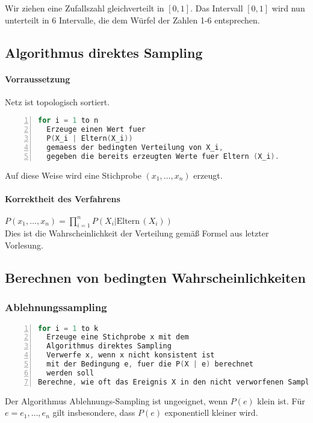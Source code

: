 \documentclass[a4paper]{scrartcl}
\begin{document}
Wir ziehen eine Zufallszahl gleichverteilt in $[0,1]$. Das Intervall $[0,1]$ wird nun unterteilt in 6 Intervalle, die dem Würfel der Zahlen 1-6 entsprechen.

\subsection{Algorithmus direktes Sampling}
\paragraph{Vorraussetzung} Netz ist topologisch sortiert.
\begin{lstlisting}[numbers=left, tabsize=4, language=C]
for i = 1 to n
  Erzeuge einen Wert fuer
  P(X_i | Eltern(X_i))
  gemaess der bedingten Verteilung von X_i,
  gegeben die bereits erzeugten Werte fuer Eltern (X_i).
\end{lstlisting}
Auf diese Weise wird eine Stichprobe $(x_1,\dots,x_n)$ erzeugt.
\paragraph{Korrektheit des Verfahrens} $P(x_1,\dots,x_n) = \prod\limits_{i=1}^{n} P(X_i | \text{Eltern} \, (X_i)) $\\
Dies ist die Wahrscheinlichkeit der Verteilung gemäß Formel aus letzter Vorlesung.
\subsection{Berechnen von bedingten Wahrscheinlichkeiten}
\subsubsection{Ablehnungssampling}
\begin{lstlisting}[numbers=left, tabsize=4, language=C]
for i = 1 to k
  Erzeuge eine Stichprobe x mit dem
  Algorithmus direktes Sampling
  Verwerfe x, wenn x nicht konsistent ist
  mit der Bedingung e, fuer die P(X | e) berechnet
  werden soll
Berechne, wie oft das Ereignis X in den nicht verworfenen Samples vorkommt.
\end{lstlisting}

Der Algorithmus Ablehnungs-Sampling ist ungeeignet, wenn $P(e)$ klein ist. Für $e = e_1,\dots,e_n$ gilt insbesondere, dass $P(e)$ exponentiell kleiner wird.
\end{document}
